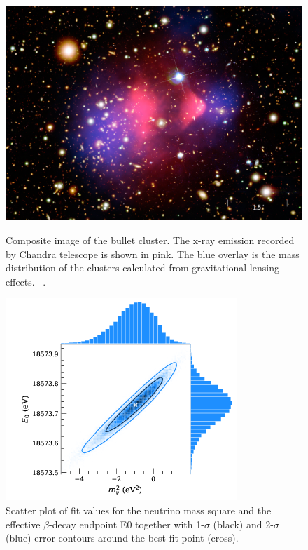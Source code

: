 \begin{figure}[t!]
\centering
  \begin{minipage}[t]{.45\textwidth}
    \centering
    \includegraphics[width=\linewidth]{thesis_figures/bullet_cluster_final.jpg}

    \caption{Composite image of the bullet cluster. The x-ray emission recorded by Chandra telescope is shown in pink. The blue overlay is the mass distribution of the clusters calculated from gravitational lensing effects. ~\cite{NASA}.}
    \label{fig:Bullet2}
  \end{minipage}
  \hfill
  \begin{minipage}[t]{.45\textwidth}
    \centering
    \includegraphics[width=\linewidth]{thesis_figures/neutrino_KATRIN.png}
    \caption{Scatter plot of fit values for the neutrino mass square and the effective $\beta$-decay endpoint E0 together with 1-$\sigma$ (black) and 2-$\sigma$ (blue) error contours around the best fit point (cross).~\cite{Aker:2019uuj}}
    \label{fig:neutrino_mass}
  \end{minipage}
\end{figure}


